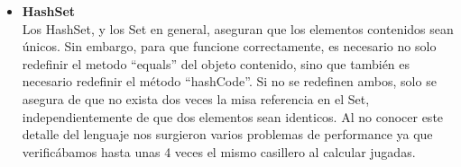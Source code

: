 \documentclass[11pt]{article}
\begin{document}
\begin{itemize}
  \item \textbf {HashSet}\\ 
   Los HashSet, y los Set en general, aseguran que los elementos
   contenidos sean \'unicos. Sin embargo, para que funcione
   correctamente, es necesario no solo redefinir el metodo ``equals''
   del objeto contenido, sino que tambi\'en es necesario redefinir el
   m\'etodo ``hashCode''. Si no se redefinen ambos, solo se asegura de
   que no exista dos veces la misa referencia en el Set,
   independientemente de que dos elementos sean identicos. Al no
   conocer este detalle del lenguaje nos surgieron varios problemas de
   performance ya que verific\'abamos hasta unas 4 veces el mismo
   casillero al calcular jugadas.

\end{itemize}
\end{document}
